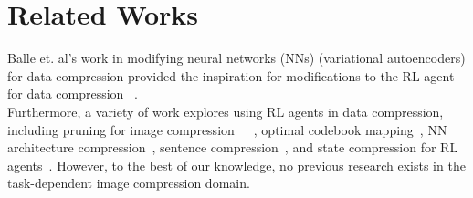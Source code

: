 \section{Related Works}
Balle et. al's work in modifying neural networks (NNs) (variational autoencoders) for data compression provided the inspiration for modifications to the RL agent for data compression ~\cite{DBLP:journals/corr/BalleLS16a}.\\
Furthermore, a variety of work explores using RL agents in data compression, including pruning for image compression~\cite{pruning2}~\cite{pruning3}~\cite{pruning1}, optimal codebook mapping~\cite{8954232}, NN architecture compression~\cite{nn_arch_comp}, sentence compression~\cite{inbook}, and state compression for RL agents~\cite{9387144}. However, to the best of our knowledge, no previous research exists in the task-dependent image compression domain.